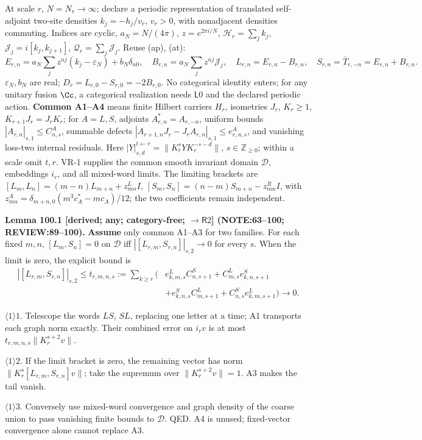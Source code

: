 At scale \(r\), \(N=N_r\to\infty\); declare a periodic representation of translated self-adjoint two-site
densities \(k_j=-h_j/v_r\), \(v_r>0\), with nonadjacent densities commuting. Indices are cyclic,
\(a_N=N/(4\pi)\), \(z=e^{2\pi i/N}\), \(\mathcal H_r=\sum_jk_j\), \(\mathcal J_j=i[k_j,k_{j+1}]\), \(\mathcal Q_r=\sum_j\mathcal J_j\). Reuse (ap), (at):
\[
 E_{r,n}=a_N\sum_jz^{nj}(k_j-\varepsilon_N)+b_N\delta_{n0},\quad
 B_{r,n}=a_N\sum_jz^{nj}\mathcal J_j,\quad L_{r,n}=E_{r,n}-B_{r,n},\quad S_{r,n}=\bar T_{r,-n}=E_{r,n}+B_{r,n}.
\]
\(\varepsilon_N,b_N\) are real; \(D_r=L_{r,0}-S_{r,0}=-2B_{r,0}\). No categorical identity enters;
for any unitary fusion \(\Cc\), a categorical realization needs \(\mathsf L0\) and the declared periodic action.
\textbf{Common A1--A4} means finite Hilbert carriers \(H_r\), isometries \(J_r\), \(K_r\ge1\),
\(K_{r+1}J_r=J_rK_r\); for \(A=L,S\), adjoints \(A_{r,n}^*=A_{r,-n}\), uniform bounds
\(|A_{r,n}|_{s,1}\le C^A_{n,s}\), summable defects
\(|A_{r+1,n}J_r-J_rA_{r,n}|_{s,1}\le e^A_{r,n,s}\), and vanishing loss-two internal residuals.
Here \(|Y|_{s,d}^{t\leftarrow r}=\|K_t^sYK_r^{-s-d}\|\), \(s\in\mathbb Z_{\ge0}\); within a scale omit \(t,r\).
VR-1 supplies the common smooth invariant domain \(\mathcal D\), embeddings \(i_r\), and all mixed-word limits.
The limiting brackets are \([L_m,L_n]=(m-n)L_{m+n}+z^L_{mn}I\), \([S_m,S_n]=(n-m)S_{m+n}-z^R_{mn}I\), with
\(z^A_{mn}=\delta_{m+n,0}(m^3c_A^*-mc_A)/12\); the two coefficients remain independent.

\textbf{Lemma 100.1 [derived; any; category-free; \(\to\mathsf R2\)] (NOTE:63--100; REVIEW:89--100).}
\textbf{Assume} only common A1--A3 for two families. For each fixed \(m,n\),
\([L_m,S_n]=0\) on \(\mathcal D\) iff \(|[L_{r,m},S_{r,n}]|_{s,2}\to0\) for every \(s\).
When the limit is zero, the explicit bound is
\begin{equation}\label{eq:100-tail}
\begin{split}
 |[L_{r,m},S_{r,n}]|_{s,2}\le t_{r,m,n,s}:=\sum_{k\ge r}\big(&e^L_{k,m,s}C^S_{n,s+1}+C^L_{m,s}e^S_{k,n,s+1}\\
 &+e^S_{k,n,s}C^L_{m,s+1}+C^S_{n,s}e^L_{k,m,s+1}\big)\longrightarrow0.
\end{split}
\end{equation}
\par\(\langle1\rangle1\). Telescope the words \(LS\), \(SL\), replacing one letter at a time; A1 transports each
graph norm exactly. Their combined error on \(i_rv\) is at most \(t_{r,m,n,s}\|K_r^{s+2}v\|\).
\par\(\langle1\rangle2\). If the limit bracket is zero, the remaining vector has norm
\(\|K_r^s[L_{r,m},S_{r,n}]v\|\); take the supremum over \(\|K_r^{s+2}v\|=1\). A3 makes the tail vanish.
\par\(\langle1\rangle3\). Conversely use mixed-word convergence and graph density of the coarse union to pass
vanishing finite bounds to \(\mathcal D\). QED. A4 is unused; fixed-vector convergence alone cannot replace A3.

